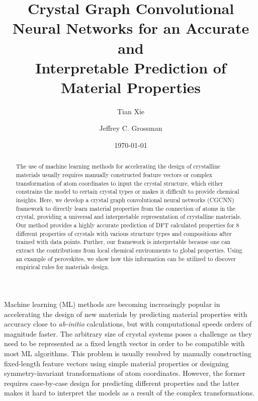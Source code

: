 \documentclass[twocolumn, prl]{revtex4-1}
\begin{document}
\title{Crystal Graph Convolutional Neural Networks for an Accurate and\\
Interpretable Prediction of Material Properties}



\author{Tian Xie}
\author{Jeffrey C. Grossman}



\date{\today}

\begin{abstract}
The use of machine learning methods for accelerating the design of crystalline materials usually requires manually constructed feature vectors or complex transformation of atom coordinates to input the crystal structure, which either constrains the model to certain crystal types or makes it difficult to provide chemical insights. Here, we develop a crystal graph convolutional neural networks (CGCNN) framework to directly learn material properties from the connection of atoms in the crystal, providing a universal and interpretable representation of crystalline materials. Our method provides a highly accurate prediction of DFT calculated properties for 8 different properties of crystals with various structure types and compositions after trained with  data points. Further, our framework is interpretable because one can extract the contributions from local chemical environments to global properties. Using an example of perovskites, we show how this information can be utilized to discover empirical rules for materials design. 
\end{abstract}

\pacs{}


\maketitle





Machine learning (ML) methods are becoming increasingly popular in accelerating the design of new materials by predicting material properties with accuracy close to \textit{ab-initio} calculations, but with computational speeds orders of magnitude faster\cite{seko2015prediction, faber2016machine, xue2016accelerated}. The arbitrary size of crystal systems poses a challenge as they need to be represented as a fixed length vector in order to be compatible with most ML algorithms. This problem is usually resolved by manually constructing fixed-length feature vectors using simple material properties\cite{isayev2017universal, seko2015prediction, xue2016accelerated, ghiringhelli2015big, isayev2015materials} or designing symmetry-invariant transformations of atom coordinates\cite{schutt2014represent, faber2015crystal, seko2017representation}. However, the former requires case-by-case design for predicting different properties and the latter makes it hard to interpret the models as a result of the complex transformations.
\end{document}
